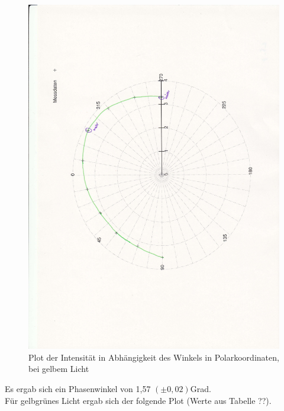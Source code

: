 \documentclass[12pt]{scrartcl}
\begin{document}
\begin{enumerate}
\begin{figure}[H]
\centering
    \includegraphics[scale = 0.3, angle = -90]{a_5_g.pdf}
  	\caption[Plot der Intensität in Abhängigkeit des Winkels in Polarkoordinaten, bei gelbem Licht]{Plot der Intensität in Abhängigkeit des Winkels in Polarkoordinaten, bei gelbem Licht}
  \label{fig:a_5_g}
\end{figure}


Es ergab sich ein Phasenwinkel von 1,57 $(\pm 0,02)$Grad.\\


Für gelbgrünes Licht ergab sich der folgende Plot (Werte aus Tabelle ??).


\end{enumerate}
\end{document}
